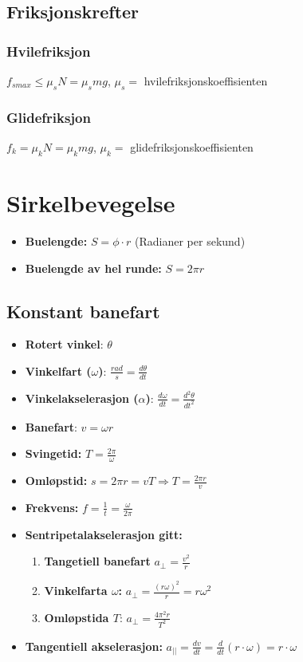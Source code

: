 \documentclass[12pt]{article}
\begin{document}
\subsection{Friksjonskrefter}
\subsubsection{Hvilefriksjon}
$f_{s max} \leq \mu_sN = \mu_smg$, $\mu_s =$ hvilefriksjonskoeffisienten
\subsubsection{Glidefriksjon}
$f_k = \mu_kN = \mu_kmg$, $\mu_k =$ glidefriksjonskoeffisienten
%
%
\section{Sirkelbevegelse}
\begin{itemize}
    \item[] \textbf{Buelengde: } $S = \phi \cdot r$ (Radianer per sekund)
    \item[] \textbf{Buelengde av hel runde:} $S = 2\pi r$
    \
\end{itemize}

\subsection{Konstant banefart}
\begin{itemize}
    \item[] \textbf{Rotert vinkel}: $\theta$
    \item[] \textbf{Vinkelfart ($\omega$)}: $\frac{rad}{s} = \frac{d\theta}{dt}$
    \item[] \textbf{Vinkelakselerasjon ($\alpha$)}: $\frac{d\omega}{dt} = \frac{d^2\theta}{dt^2}$
    \item[] \textbf{Banefart}: $v = \omega r$
    \item[] \textbf{Svingetid:} $T = \frac{2\pi}{\omega}$
    \item[] \textbf{Omløpstid:} $s = 2\pi r = vT \Rightarrow T = \frac{2\pi r}{v}$
    \item[] \textbf{Frekvens:} $f = \frac{1}{t} = \frac{\omega}{2\pi} $
    \item[] \textbf{Sentripetalakselerasjon gitt:}
    \begin{enumerate}
        \item \textbf{Tangetiell banefart} $a_\bot = \frac{v^2}{r}$
        \item \textbf{Vinkelfarta $\omega$:} $a_\bot = \frac{(r\omega)^2}{r} = r\omega^2 $
        \item \textbf{Omløpstida $T$}: $a_\bot = \frac{4\pi^2r}{T^2}$
    \end{enumerate}
    \item[] \textbf{Tangentiell akselerasjon:} $a_{||} = \frac{dv}{dt} = \frac{d}{dt}(r\cdot \omega) = r\cdot \omega$
\end{itemize}
\pagebreak
\end{document}
